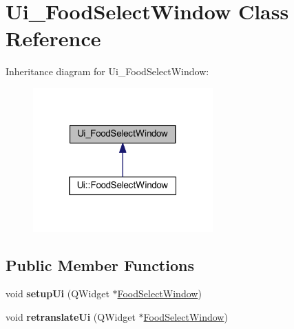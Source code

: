 \hypertarget{class_ui___food_select_window}{}\section{Ui\+\_\+\+Food\+Select\+Window Class Reference}
\label{class_ui___food_select_window}


Inheritance diagram for Ui\+\_\+\+Food\+Select\+Window\+:
\nopagebreak
\begin{figure}[H]
\begin{center}
\leavevmode
\includegraphics[width=196pt]{class_ui___food_select_window__inherit__graph}
\end{center}
\end{figure}
\subsection*{Public Member Functions}
\begin{DoxyCompactItemize}
\item 
\mbox{\label{class_ui___food_select_window_ae81797d9f7f0d379818c83b9867e0333}} 
void {\bfseries setup\+Ui} (Q\+Widget $\ast$\mbox{\hyperlink{class_food_select_window}{Food\+Select\+Window}})
\item 
\mbox{\label{class_ui___food_select_window_aa0b4201d4db08190cb97fa76fbf3f39c}} 
void {\bfseries retranslate\+Ui} (Q\+Widget $\ast$\mbox{\hyperlink{class_food_select_window}{Food\+Select\+Window}})
\end{DoxyCompactItemize}
